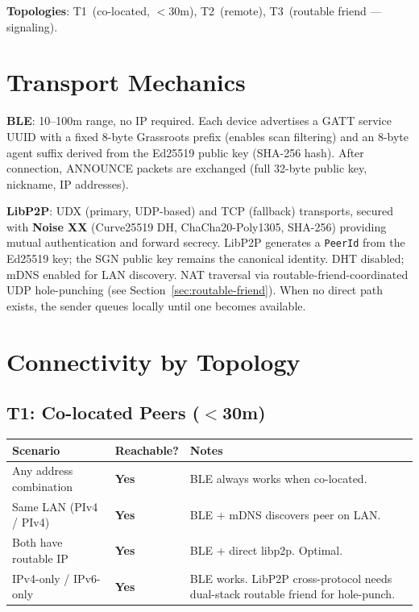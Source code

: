 \documentclass[11pt,a4paper]{article}
\newcommand{\yes}{\textcolor{yes}{\textbf{Yes}}}
\begin{document}
\textbf{Topologies}: T1~(co-located, $<$30m), T2~(remote), T3~(routable friend --- signaling).

\section{Transport Mechanics}

\textbf{BLE}: 10--100m range, no IP required. Each device advertises a GATT service UUID with a fixed 8-byte Grassroots prefix (enables scan filtering) and an 8-byte agent suffix derived from the Ed25519 public key (SHA-256 hash). After connection, ANNOUNCE packets are exchanged (full 32-byte public key, nickname, IP addresses).

\textbf{LibP2P}: UDX (primary, UDP-based) and TCP (fallback) transports, secured with \textbf{Noise XX} (Curve25519 DH, ChaCha20-Poly1305, SHA-256) providing mutual authentication and forward secrecy. LibP2P generates a \texttt{PeerId} from the Ed25519 key; the SGN public key remains the canonical identity. DHT disabled; mDNS enabled for LAN discovery. NAT traversal via routable-friend-coordinated UDP hole-punching (see Section~\ref{sec:routable-friend}). When no direct path exists, the sender queues locally until one becomes available.

\section{Connectivity by Topology}

\subsection{T1: Co-located Peers ($<$30m)}

\begin{table}[H]
\centering\small
\begin{tabular}{L{4cm} C{2cm} L{5.5cm}}
\toprule
\textbf{Scenario} & \textbf{Reachable?} & \textbf{Notes} \\
\midrule
Any address combination & \yes & BLE always works when co-located. \\
Same LAN (PIv4 / PIv4) & \yes & BLE + mDNS discovers peer on LAN. \\
Both have routable IP & \yes & BLE + direct libp2p. Optimal. \\
IPv4-only / IPv6-only & \yes & BLE works. LibP2P cross-protocol needs dual-stack routable friend for hole-punch. \\
\bottomrule
\end{tabular}
\end{table}
\end{document}
